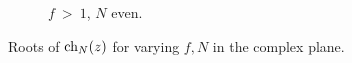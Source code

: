 \documentclass[11pt,reqno]{amsart}
\numberwithin{equation}{section}
\theoremstyle{plain}
\newcommand{\ch}{\textnormal{ch}}
\begin{document}
\begin{figure}[h]
\begin{subfigure}[b]{0.45\textwidth}
        \caption{$f \ > \  1$, $N$ even.}
        \label{fig:fig4}
    \end{subfigure}
    \caption{Roots of $\ch_N(z)$ for varying $f, N$ in the complex plane.}
    \label{fig:overall}
\end{figure}
 






\newpage
\end{document}
